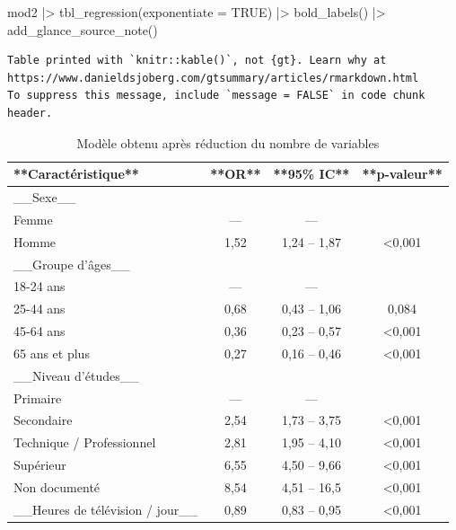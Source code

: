 \documentclass[
  letterpaper,
  DIV=11,
  numbers=noendperiod,
  oneside]{scrreprt}
\newenvironment{Shaded}{\begin{snugshade}}{\end{snugshade}}
\newcommand{\AttributeTok}[1]{\textcolor[rgb]{0.40,0.45,0.13}{#1}}
\newcommand{\ConstantTok}[1]{\textcolor[rgb]{0.56,0.35,0.01}{#1}}
\newcommand{\FunctionTok}[1]{\textcolor[rgb]{0.28,0.35,0.67}{#1}}
\newcommand{\NormalTok}[1]{\textcolor[rgb]{0.00,0.23,0.31}{#1}}
\newcommand{\SpecialCharTok}[1]{\textcolor[rgb]{0.37,0.37,0.37}{#1}}
\begin{document}
\begin{Shaded}
\begin{Highlighting}[]
\NormalTok{mod2 }\SpecialCharTok{|\textgreater{}} 
  \FunctionTok{tbl\_regression}\NormalTok{(}\AttributeTok{exponentiate =} \ConstantTok{TRUE}\NormalTok{) }\SpecialCharTok{|\textgreater{}} 
  \FunctionTok{bold\_labels}\NormalTok{() }\SpecialCharTok{|\textgreater{}} 
  \FunctionTok{add\_glance\_source\_note}\NormalTok{()}
\end{Highlighting}
\end{Shaded}

\begin{verbatim}
Table printed with `knitr::kable()`, not {gt}. Learn why at
https://www.danieldsjoberg.com/gtsummary/articles/rmarkdown.html
To suppress this message, include `message = FALSE` in code chunk header.
\end{verbatim}

\hypertarget{tbl-regression-logistique-glance_source_note}{}
\begin{table}
\caption{\label{tbl-regression-logistique-glance_source_note}Modèle obtenu après réduction du nombre de variables }\tabularnewline

\centering
\begin{tabular}{l|c|c|c}
\hline
**Caractéristique** & **OR** & **95\% IC** & **p-valeur**\\
\hline
\_\_Sexe\_\_ &  &  & \\
\hline
Femme & — & — & \\
\hline
Homme & 1,52 & 1,24 – 1,87 & <0,001\\
\hline
\_\_Groupe d'âges\_\_ &  &  & \\
\hline
18-24 ans & — & — & \\
\hline
25-44 ans & 0,68 & 0,43 – 1,06 & 0,084\\
\hline
45-64 ans & 0,36 & 0,23 – 0,57 & <0,001\\
\hline
65 ans et plus & 0,27 & 0,16 – 0,46 & <0,001\\
\hline
\_\_Niveau d'études\_\_ &  &  & \\
\hline
Primaire & — & — & \\
\hline
Secondaire & 2,54 & 1,73 – 3,75 & <0,001\\
\hline
Technique / Professionnel & 2,81 & 1,95 – 4,10 & <0,001\\
\hline
Supérieur & 6,55 & 4,50 – 9,66 & <0,001\\
\hline
Non documenté & 8,54 & 4,51 – 16,5 & <0,001\\
\hline
\_\_Heures de télévision / jour\_\_ & 0,89 & 0,83 – 0,95 & <0,001\\
\hline
\end{tabular}
\end{table}
\end{document}
